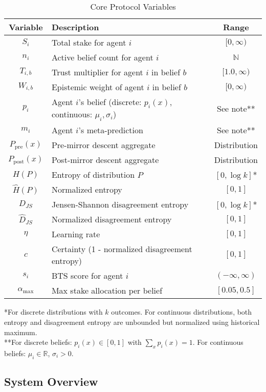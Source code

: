 \documentclass[11pt,a4paper]{article}
\begin{document}
\begin{table}[h]
\centering
\caption{Core Protocol Variables}
\begin{tabular}{|c|l|c|}
\hline
\textbf{Variable} & \textbf{Description} & \textbf{Range} \\
\hline
$S_i$ & Total stake for agent $i$ & $[0, \infty)$ \\
$n_i$ & Active belief count for agent $i$ & $\mathbb{N}$ \\
$T_{i,b}$ & Trust multiplier for agent $i$ in belief $b$ & $[1.0, \infty)$ \\
$W_{i,b}$ & Epistemic weight of agent $i$ in belief $b$ & $[0, \infty)$ \\
$p_i$ & Agent $i$'s belief (discrete: $p_i(x)$, continuous: $\mu_i, \sigma_i$) & See note** \\
$m_i$ & Agent $i$'s meta-prediction & See note** \\
$P_{\text{pre}}(x)$ & Pre-mirror descent aggregate & Distribution \\
$P_{\text{post}}(x)$ & Post-mirror descent aggregate & Distribution \\
$H(P)$ & Entropy of distribution $P$ & $[0, \log k]$* \\
$\hat{H}(P)$ & Normalized entropy & $[0, 1]$ \\
$D_{JS}$ & Jensen-Shannon disagreement entropy & $[0, \log k]$* \\
$\hat{D}_{JS}$ & Normalized disagreement entropy & $[0, 1]$ \\
$\eta$ & Learning rate & $[0, 1]$ \\
$c$ & Certainty (1 - normalized disagreement entropy) & $[0, 1]$ \\
$s_i$ & BTS score for agent $i$ & $(-\infty, \infty)$ \\
$\alpha_{\text{max}}$ & Max stake allocation per belief & $[0.05, 0.5]$ \\
\hline
\end{tabular}
\end{table}
\footnotesize{*For discrete distributions with $k$ outcomes. For continuous distributions, both entropy and disagreement entropy are unbounded but normalized using historical maximum.\\
**For discrete beliefs: $p_i(x) \in [0,1]$ with $\sum_x p_i(x) = 1$. For continuous beliefs: $\mu_i \in \mathbb{R}$, $\sigma_i > 0$.}

\subsection{System Overview}
\end{document}
